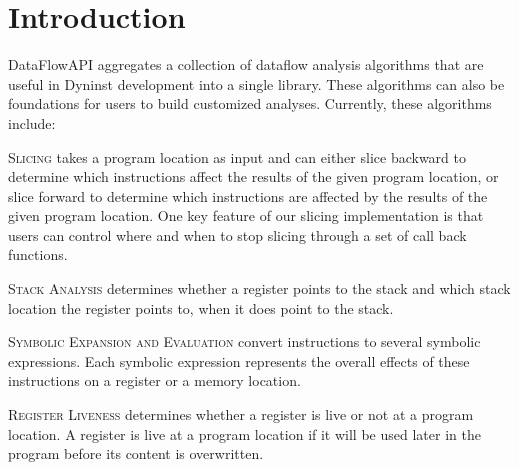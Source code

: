 \section{Introduction}
\label{sec:intro}

DataFlowAPI aggregates a collection of dataflow analysis algorithms that are
useful in Dyninst development into a single library. These algorithms can also
be foundations for users to build customized analyses. Currently, these algorithms include:

\begin{itemize}[leftmargin=0pt,label=$\circ$]

{\item {\scshape Slicing}
takes a program location as input and can either slice
backward to determine which instructions affect the results of the given program location, or
slice forward to determine which instructions are affected by the results of the
given program location. One key feature of our slicing implementation is that
users can control where and when to stop slicing through a set of call back
functions.
}

{\item {\scshape Stack Analysis}
determines whether a register points to the stack and
which stack location the register points to, when it does point to the stack.
}

{\item {\scshape Symbolic Expansion and Evaluation}
convert instructions to
several symbolic expressions. Each symbolic expression represents the overall effects of
these instructions on a register or a memory location.
}

{\item {\scshape Register Liveness}
determines whether a register is live or not at a program
location. A register is live at a program location if it will be used later in the program before its
content is overwritten. 
}
\end{itemize}
